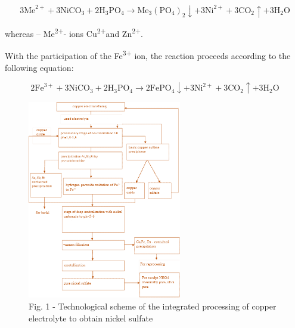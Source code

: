 \begin{equation}
3\text{Me}^{2+} + 3\text{NiCO}_3 + 2\text{H}_3\text{PO}_4 
\to \text{Me}_3(\text{PO}_4)_2\downarrow + 3\text{Ni}^{2+} + 3\text{CO}_2\uparrow + 3\text{H}_2\text{O}
\end{equation}

whereas -- Me\textsuperscript{2+}- ions Cu\textsuperscript{2+}and
Zn\textsuperscript{2+}.

With the participation of the Fe\textsuperscript{3+} ion, the reaction
proceeds according to the following equation:

\begin{equation}
2\text{Fe}^{3+} + 3\text{NiCO}_3 + 2\text{H}_3\text{PO}_4 
\to 2\text{FePO}_4\downarrow + 3\text{Ni}^{2+} + 3\text{CO}_2\uparrow + 3\text{H}_2\text{O}
\end{equation}

\begin{figure}[H]
	\centering
	\includegraphics[width=0.6\textwidth]{media/chem2/image17}
	\caption*{Fig. 1 - Technological scheme of the integrated processing of copper electrolyte to obtain nickel sulfate}
\end{figure}

